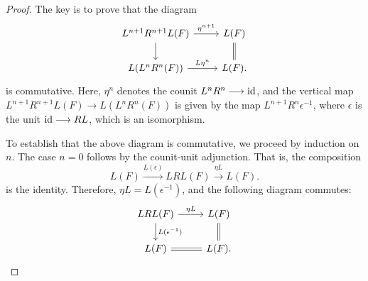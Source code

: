 \begin{proof}
The key is to prove that the diagram
\begin{equation}\label{eq_Ltl_com_diag}
\begin{tikzcd}
L^{n + 1}R^{n + 1}L(F) \arrow{r}{\eta^{n + 1}} \arrow{d} &
L(F) \arrow[equals]{d} \\
L(L^{n}R^n(F)) \arrow{r}{L\eta^{n}} &
L(F).
\end{tikzcd}
\end{equation}
is commutative. Here, $\eta^n$ denotes the counit $L^nR^n \longrightarrow \mathrm{id}$,
and the vertical map $L^{n + 1}R^{n + 1}L(F) \to L(L^nR^n (F))$ is 
given by the map $L^{n + 1}R^n \epsilon^{-1}$, where $\epsilon$ is
the unit $\mathrm{id} \longrightarrow RL$, which is an isomorphism.

To establish that the above diagram is commutative, we proceed by 
induction on $n$. The case $n = 0$ follows by the counit-unit 
adjunction. That is, the composition
\[
L(F) \stackrel{L(\epsilon)}{\to} LRL(F) \stackrel{\eta L}{\to} 
   L(F).
\]
is the identity. Therefore, $\eta L = L(\epsilon^{-1})$, and the
following diagram commutes:
\[
\begin{tikzcd}
LRL(F) \arrow{r}{\eta L} \arrow{d}{L(\epsilon^{-1})} &
L(F) \arrow[equals]{d} \\
L(F) \arrow[equals]{r} & L(F).
\end{tikzcd}
\]


\end{proof}

